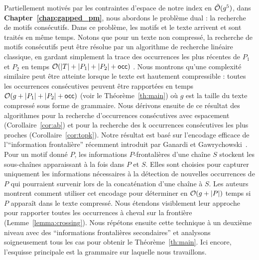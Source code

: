 Partiellement motivés par les contraintes d'espace de notre index en $\tilde {\mathcal{O}}(g^5)$, dans \textbf{Chapter~\ref{chap:gapped_pm}}, nous abordons le problème dual : la recherche de motifs consécutifs. Dans ce problème, les motifs et le texte arrivent et sont traités en même temps. Notons que pour un texte non compressé, la recherche de motifs consécutifs peut être résolue par un algorithme de recherche linéaire classique, en gardant simplement la trace des occurrences les plus récentes de $P_1$ et $P_2$ en temps $\mathcal{O}(|T|+|P_1|+|P_2|+\mathsf{occ})$ .
Nous montrons qu'une complexité similaire peut être atteinte lorsque le texte est hautement compressible : toutes les occurrences consécutives peuvent être rapportées en temps $\mathcal{O}(g+|P_1|+|P_2|+\mathsf{occ})$ (voir le Théorème~\ref{th:main}) où $g$ est la taille du texte compressé sous forme de grammaire. Nous dérivons ensuite de ce résultat des algorithmes pour la recherche d'occurrences consécutives avec espacement (Corollaire~\ref{cor:ab}) et pour la recherche des k occurrences consécutives les plus proches (Corollaire~\ref{cor:topk}).
%
Notre résultat est basé sur l'encodage efficace de l'``information frontalière'' récemment introduit par Ganardi et Gawrychowski~\cite{DBLP:conf/soda/GanardiG22}. Pour un motif donné $P$, les informations $P$-frontalières d'une chaîne $S$ stockent les sous-chaînes apparaissant à la fois dans $P$ et $S$. Elles sont choisies pour capturer uniquement les informations nécessaires à la détection de nouvelles occurrences de $P$ qui pourraient survenir lors de la concaténation d'une chaîne à $S$. 
%
Les auteurs montrent comment utiliser cet encodage pour déterminer en $\mathcal{O}(g+|P|)$ temps si $P$ apparaît dans le texte compressé. Nous étendons visiblement leur approche pour rapporter toutes les occurrences à cheval sur la frontière (Lemme~\ref{lemma:crossing}). Nous répétons ensuite cette technique à un deuxième niveau avec des ``informations frontalières secondaires'' et analysons soigneusement tous les cas pour obtenir le Théorème~\ref{th:main}. Ici encore, l'esquisse principale est la grammaire sur laquelle nous travaillons.\\


